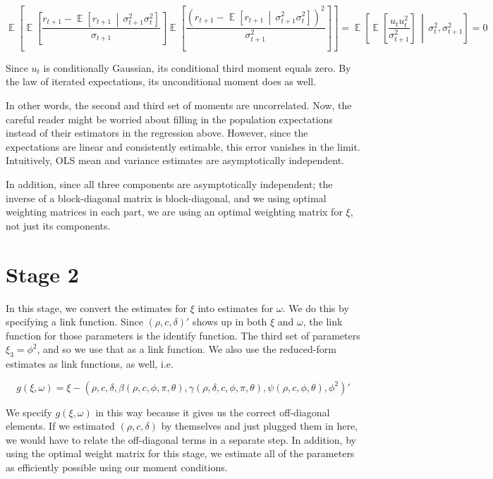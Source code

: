 \documentclass[11pt, letterpaper, twoside, final]{article}
\newcommand*{\mvert}{\,\middle\vert\,}
\DeclareMathOperator*{\E}{\mathbb{E}}
\begin{document}
\begin{equation}
    \E\left[\E\left[\frac{r_{t+1} - \E\left[r_{t+1}\mvert \sigma^2_{t+1} \sigma^2_t\right]}{\sigma_{t+1}} \right]
    \E\left[\frac{(r_{t+1} - \E\left[r_{t+1} \mvert \sigma^2_{t+1} \sigma^2_t\right])^2}{\sigma^2_{t+1}}\right]
    \right] 
%
    = \E\left[\E\left[\frac{u_t u_t^2}{\sigma^2_{t+1}}\right] \mvert \sigma^2_t, \sigma^2_{t+1} \right]  = 0
\end{equation}

Since $u_t$ is conditionally Gaussian, its conditional third moment equals zero.  
By the law of iterated expectations, its unconditional moment does as well.

In other words, the second and third set of moments are uncorrelated.
Now, the careful reader might be worried about filling in the population expectations instead of their estimators
in the regression above.
However, since the expectations are linear and consistently estimable, this error vanishes in the limit. 
Intuitively, OLS mean and variance estimates are asymptotically independent.

In addition, since all three components are asymptotically independent; the inverse of a block-diagonal matrix is
block-diagonal, and we using optimal weighting matrices in each part, we are using an
optimal weighting matrix for $\xi$, not just its components.


\section{Stage 2}

In this stage, we convert the estimates for $\xi$ into estimates for $\omega$. 
We do this by specifying a link function.
Since $(\rho, c, \delta)'$ shows up in both $\xi$ and $\omega$, the link function for those parameters is the
identify function.
The third set of parameters $\xi_3 = \phi^2$, and so we use that as a link function.
We also use the reduced-form estimates as link functions, as well, i.e.\@

\begin{equation}
    g(\xi, \omega) = \xi - (\rho, c, \delta, \beta(\rho, c, \phi, \pi, \theta), \gamma(\rho, \delta, c, \phi, \pi,
    \theta), \psi(\rho, c, \phi, \theta), \phi^2)'
\end{equation}

We specify $g(\xi, \omega)$ in this way because it gives us the correct off-diagonal elements.
If we estimated $(\rho, c, \delta)$ by themselves and just plugged them in here, we would have to relate the
off-diagonal terms in a separate step.
In addition, by using the optimal weight matrix for this stage, we estimate all of the parameters as efficiently
possible using our moment conditions.
\end{document}
